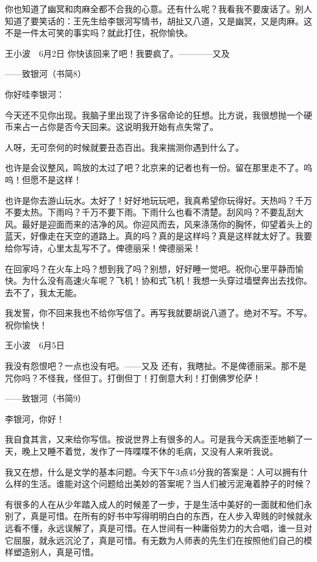 你也知道了幽冥和肉麻全都不合我的心意。还有什么呢？我看我不要废话了。别人知道了要笑话的：王先生给李银河写情书，胡扯又八道，又是幽冥，又是肉麻。这不是一件太可笑的事实吗？就此打住，祝你愉快。 

王小波　6月2日 你快该回来了吧！我要疯了。————又及 







——致银河（书简8） 

你好哇李银河： 

今天还不见你出现。我脑子里出现了许多宿命论的狂想。比方说，我很想抛一个硬币来占一占你是否今天回来。这说明我开始有点失常了。 

人呀，无可奈何的时候就要丑态百出。我来揣测你遇到什么了。 

也许是会议整风，鸣放的太过了吧？北京来的记者也有一份。留在那里走不了。呜呜！但愿不是这样！ 

也许是你去游山玩水。太好了！好好地玩玩吧，我真希望你玩得好。天热吗？千万不要太热。下雨吗？千万不要下雨。下雨什么也看不清楚。刮风吗？不要乱刮大风。最好是迎面而来的洁净的风。你迎风而去，风来涤荡你的胸怀，仰望着头上的蓝天，好像走在天空的道路上。真的吗？真的是这样吗？真是这样就太好了。我要给你写诗，心里太乱写不了。俾德丽采！俾德丽采！ 

在回家吗？在火车上吗？想到我了吗？别想，好好睡一觉吧。祝你心里平静而愉快。为什么没有高速火车呢？飞机！协和式飞机！我想一头穿过墙壁奔出去找你。去不了，我太无能。 

我发誓，你不回来我也不给你写信了。再写我就要胡说八道了。绝对不写。不写。祝你愉快！　 

王小波　6月5日 

我没有怨恨吧？一点也没有吧。——又及 还有，我瞎扯。不是俾德丽采。那不是咒你吗？不怪我，怪但丁。打倒但丁！打倒意大利！打倒佛罗伦萨！ 







——致银河（书简9） 

李银河，你好！ 

我自食其言，又来给你写信。按说世界上有很多的人。可是我今天病歪歪地躺了一天，晚上又睡不着觉，发作了一阵喋喋不休的毛病，又没有人来听我说。 

我又在想，什么是文学的基本问题。今天下午3点45分我的答案是：人可以拥有什么样的生活。谁能对这个问题给出美妙的答案呢？当人们被污泥淹着脖子的时候？ 

有很多的人在从少年踏入成人的时候差了一步，于是生活中美好的一面就和他们永别了，真是可惜。在所有的好书中写得明明白白的东西，在人步入卑贱的时候就永远看不懂，永远误解了，真是可惜。在人世间有一种庸俗势力的大合唱，谁一旦对它屈服，就永远沉沦了，真是可惜。有无数为人师表的先生们在按照他们自己的模样塑造别人，真是可惜。 

